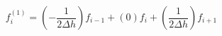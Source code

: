 \begin{equation} 
f^{{(1)}}_{i} = \left(- \frac{1}{2 {\Delta h}}\right)f_{{i-1}}+ \left(0\right)f_{{i}}+ \left(\frac{1}{2 {\Delta h}}\right)f_{{i+1}}
 \end{equation} 
